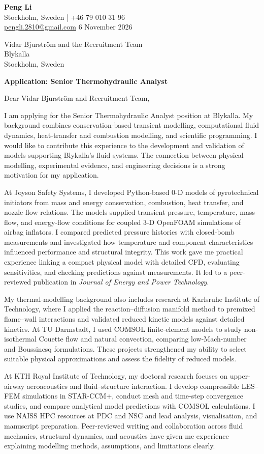 \documentclass[a4paper,11pt]{article}
\begin{document}
{\LARGE\textbf{Peng Li}}\\[3pt]
Stockholm, Sweden \quad | \quad +46 79 010 31 96\\
\href{mailto:pengli.2810@gmail.com}{pengli.2810@gmail.com}
\hfill 6 November 2026

Vidar Bjurström and the Recruitment Team\\
Blykalla\\
Stockholm, Sweden

\textbf{Application: Senior Thermohydraulic Analyst}

Dear Vidar Bjurström and Recruitment Team,

I am applying for the Senior Thermohydraulic Analyst position at Blykalla. My background
combines conservation-based transient modelling, computational fluid dynamics, heat-transfer
and combustion modelling, and scientific programming. I would like to contribute this
experience to the development and validation of models supporting Blykalla's fluid systems.
The connection between physical modelling, experimental evidence, and engineering decisions
is a strong motivation for my application.

At Joyson Safety Systems, I developed Python-based 0-D models of pyrotechnical initiators
from mass and energy conservation, combustion, heat transfer, and nozzle-flow relations.
The models supplied transient pressure, temperature, mass-flow, and energy-flow conditions
for coupled 3-D OpenFOAM simulations of airbag inflators. I compared predicted pressure
histories with closed-bomb measurements and investigated how temperature and component
characteristics influenced performance and structural integrity. This work gave me practical
experience linking a compact physical model with detailed CFD, evaluating sensitivities,
and checking predictions against measurements. It led to a peer-reviewed publication in
\textit{Journal of Energy and Power Technology}.

My thermal-modelling background also includes research at Karlsruhe Institute of Technology,
where I applied the reaction--diffusion manifold method to premixed flame--wall interactions
and validated reduced kinetic models against detailed kinetics. At TU Darmstadt, I used
COMSOL finite-element models to study non-isothermal Couette flow and natural convection,
comparing low-Mach-number and Boussinesq formulations. These projects strengthened my
ability to select suitable physical approximations and assess the fidelity of reduced models.

At KTH Royal Institute of Technology, my doctoral research focuses on upper-airway
aeroacoustics and fluid--structure interaction. I develop compressible LES--FEM simulations
in STAR-CCM+, conduct mesh and time-step convergence studies, and compare analytical
model predictions with COMSOL calculations. I use NAISS HPC resources at PDC and NSC
and lead analysis, visualisation, and manuscript preparation. Peer-reviewed writing and
collaboration across fluid mechanics, structural dynamics, and acoustics have given me
experience explaining modelling methods, assumptions, and limitations clearly.
\end{document}
